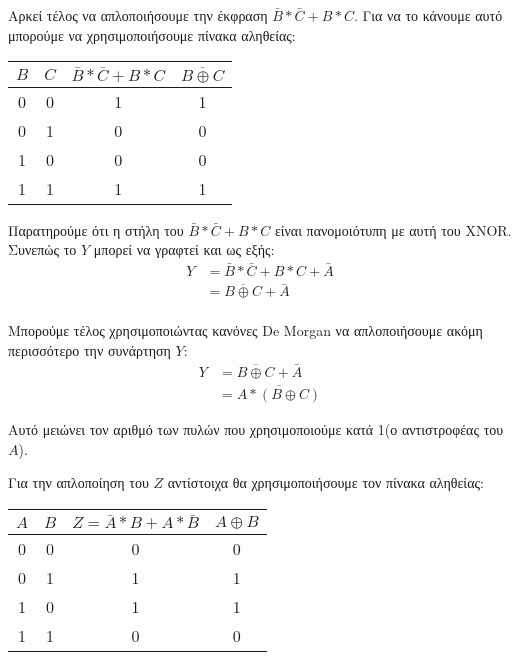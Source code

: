 \documentclass[]{article}
\begin{document}
Αρκεί τέλος να απλοποιήσουμε την έκφραση $\bar{B} * \bar{C} + B * C$. Για να το κάνουμε αυτό μπορούμε να χρησιμοποιήσουμε πίνακα αληθείας:
\begin{center}
	\begin{tabular} {|c|c|c|c|}
		\hline \rule{0pt}{11pt}$B$ & $C$ & $\bar{B} * \bar{C} + B * C$ & $\overline{B \oplus C}$ \\
		\hline 0                   & 0   & 1                           & 1                       \\
		0                          & 1   & 0                           & 0                       \\
		1                          & 0   & 0                           & 0                       \\
		1                          & 1   & 1                           & 1                       \\
		\hline
	\end{tabular}
\end{center}

Παρατηρούμε ότι η στήλη του $\bar{B} * \bar{C} + B * C$ είναι πανομοιότυπη με αυτή του XNOR. Συνεπώς το $Y$ μπορεί να γραφτεί και ως εξής:
\begin{align*}
	Y & = \bar{B} * \bar{C} + B * C + \bar{A} \\
	  & = \overline{B \oplus C} + \bar{A}     \\
\end{align*}

Μπορούμε τέλος χρησιμοποιώντας κανόνες De Morgan να απλοποιήσουμε ακόμη περισσότερο την συνάρτηση $Y$:
\begin{align*}
	Y & = \overline{B \oplus C} + \bar{A} \\
    & = \overline{A * (B \oplus C)}
\end{align*}

Αυτό μειώνει τον αριθμό των πυλών που χρησιμοποιούμε κατά 1(ο αντιστροφέας του $A$).

Για την απλοποίηση του $Z$ αντίστοιχα θα χρησιμοποιήσουμε τον πίνακα αληθείας:
\begin{center}
	\begin{tabular} {|c|c|c|c|}
		\hline \rule{0pt}{11pt}$A$ & $B$ & $Z = \bar{A} * B + A * \bar{B}$ & $A \oplus B$ \\
		\hline 0                   & 0   & 0                               & 0            \\
		0                          & 1   & 1                               & 1            \\
		1                          & 0   & 1                               & 1            \\
		1                          & 1   & 0                               & 0            \\
		\hline
	\end{tabular}
\end{center}
\end{document}
